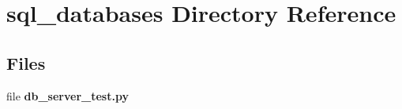 \section{sql\+\_\+databases Directory Reference}
\label{dir_74cbf48e5f1d9782e10140a70c792cbd}
\subsection*{Files}
\begin{DoxyCompactItemize}
\item 
file \textbf{ db\+\_\+server\+\_\+test.\+py}
\end{DoxyCompactItemize}
